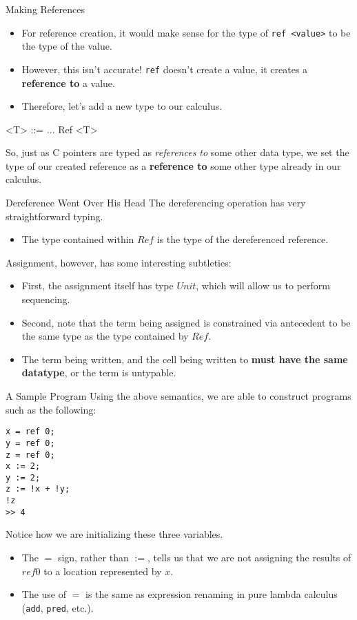 \documentclass[11pt]{beamer}
\begin{document}
\begin{frame}[fragile=singleslide]{Making References}
\begin{itemize}
\item For reference creation, it would make sense for the type of \texttt{ref <value>} to be the type of the value.
\item However, this isn't accurate!  \texttt{ref} doesn't create a value, it creates a \textbf{reference to} a value.
\item Therefore, let's add a new type to our calculus.  
\end{itemize}

\begin{grammar}
<T> ::= ...
\alt Ref <T>
\end{grammar}

So, just as C pointers are typed as \emph{references to} some other data type, we set the type of our created reference as a \textbf{reference to} some other type already in our calculus.  

\end{frame}


\begin{frame}[fragile=singleslide]{Dereference Went Over His Head}
The dereferencing operation has very straightforward typing.
\begin{itemize}
\item The type contained within $Ref$ is the type of the dereferenced reference.  
\end{itemize}
Assignment, however, has some interesting subtleties:  
\begin{itemize}
\item First, the assignment itself has type $Unit$, which will allow us to perform sequencing.  
\item Second, note that the term being assigned is constrained via antecedent to be the same type as the type contained by $Ref$.  
\item The term being written, and the cell being written to \textbf{must have the same datatype}, or the term is untypable.  
\end{itemize}
\end{frame}


\begin{frame}[fragile=singleslide]{A Sample Program}
Using the above semantics, we are able to construct programs such as the following:

\begin{lstlisting}[style=C]
x = ref 0;
y = ref 0;
z = ref 0;
x := 2;
y := 2;
z := !x + !y;
!z 
>> 4
\end{lstlisting}
Notice how we are initializing these three variables.  
\begin{itemize}
\item The $=$ sign, rather than $:=$, tells us that we are not assigning the results of $ref 0$ to a location represented by $x$.
\item The use of $=$ is the same as expression renaming in pure lambda calculus (\texttt{add}, \texttt{pred}, etc.).
\end{itemize}
\end{frame}
\end{document}
